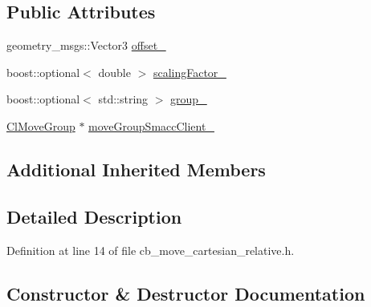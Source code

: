 \subsection*{Public Attributes}
\begin{DoxyCompactItemize}
\item 
geometry\+\_\+msgs\+::\+Vector3 \hyperlink{classmove__group__interface__client_1_1CbMoveCartesianRelative_affe67c635e1cd77013609a784ac53b92}{offset\+\_\+}
\item 
boost\+::optional$<$ double $>$ \hyperlink{classmove__group__interface__client_1_1CbMoveCartesianRelative_a62cdf88c437312ac79c8acc01519d634}{scaling\+Factor\+\_\+}
\item 
boost\+::optional$<$ std\+::string $>$ \hyperlink{classmove__group__interface__client_1_1CbMoveCartesianRelative_a5da33d1b7d822c971f8e282e5ade7238}{group\+\_\+}
\item 
\hyperlink{classmove__group__interface__client_1_1ClMoveGroup}{Cl\+Move\+Group} $\ast$ \hyperlink{classmove__group__interface__client_1_1CbMoveCartesianRelative_aaa8b86680f04a6cfd7ac6b42268bf04d}{move\+Group\+Smacc\+Client\+\_\+}
\end{DoxyCompactItemize}
\subsection*{Additional Inherited Members}


\subsection{Detailed Description}


Definition at line 14 of file cb\+\_\+move\+\_\+cartesian\+\_\+relative.\+h.



\subsection{Constructor \& Destructor Documentation}
\mbox{\label{classmove__group__interface__client_1_1CbMoveCartesianRelative_acb71f733e58a5f5c2d8e4cc5dad9768f}} 
